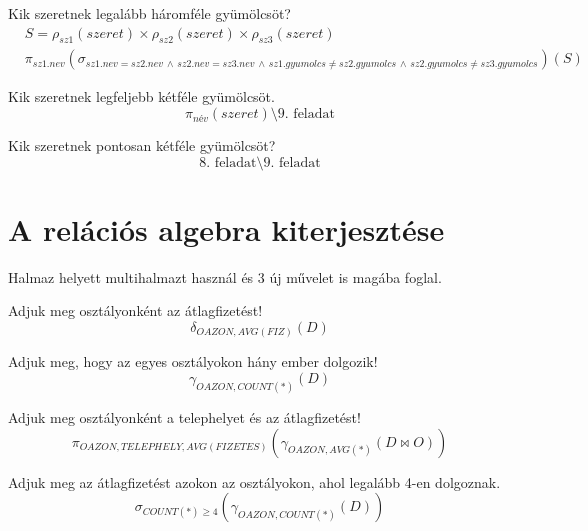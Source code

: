 \documentclass[a4paper,12pt]{article}
\theoremstyle{definition}
\begin{document}
\begin{exercise}
	Kik szeretnek legalább háromféle gyümölcsöt?
	\begin{align*}
	& S = \rho_{sz1}\left(szeret\right) \times \rho_{sz2}\left(szeret\right) \times \rho_{sz3}\left(szeret\right) \\
	&\pi_{sz1.nev}\left(\sigma_{sz1.nev = sz2.nev \, \land \, sz2.nev = sz3.nev \, \land \, sz1.gyumolcs \ne sz2.gyumolcs \, \land \, sz2.gyumolcs \ne sz3.gyumolcs}\right){\left( S \right) }
	\end{align*}
\end{exercise}

\begin{exercise}
	Kik szeretnek legfeljebb kétféle gyümölcsöt.
	\[
	\pi_{név}\left(szeret \right) \setminus {\text{9. feladat}}
	\]
\end{exercise}

\begin{exercise}
	Kik szeretnek pontosan kétféle gyümölcsöt?
	\[
	\text{8. feladat} \setminus \text{9. feladat}
	\]
\end{exercise}

\section{A relációs algebra kiterjesztése}
Halmaz helyett multihalmazt használ és 3 új művelet is magába foglal.

\begin{exercise}
	Adjuk meg osztályonként az átlagfizetést!
	\[
	\delta_{OAZON, AVG(FIZ)}{\left( D \right) }
	\]
\end{exercise}

\begin{exercise}
	Adjuk meg, hogy az egyes osztályokon hány ember dolgozik!
	\[
	\gamma_{OAZON, COUNT(*)}{\left( D \right) }
	\]
\end{exercise}

\begin{exercise}
	Adjuk meg osztályonként a telephelyet és az átlagfizetést!
	\[
	\pi_{OAZON, TELEPHELY, AVG(FIZETES)}{\left( \gamma_{OAZON, AVG(*)}{\left( D \bowtie O \right) } \right) }
	\]
\end{exercise}

\begin{exercise}
	Adjuk meg az átlagfizetést azokon az osztályokon, ahol legalább 4-en dolgoznak.
	\[
	\sigma_{COUNT(*) \ge 4}{\left( \gamma_{OAZON, COUNT(*)}{\left( D \right) }\right)}
	\]
\end{exercise}
\end{document}
